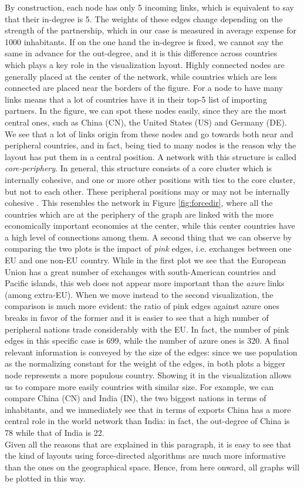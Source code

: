 By construction, each node has only 5 incoming links, which is equivalent to say that their in-degree is 5. The weights of these edges change depending on the strength of the partnership, which in our case is measured in average expense for 1000 inhabitants. If on the one hand the in-degree is fixed, we cannot say the same in advance for the out-degree, and it is this difference across countries which plays a key role in the visualization layout. Highly connected nodes are generally placed at the center of the network, while countries which are less connected are placed near the borders of the figure. For a node to have many links means that a lot of countries have it in their top-5 list of importing partners. In the figure, we can spot these nodes easily, since they are the most central ones, such as China (CN), the United States (US) and Germany (DE). We see that a lot of links origin from these nodes and go towards both near and peripheral countries, and in fact, being tied to many nodes is the reason why the layout has put them in a central position. A network with this structure is called \textit{core-periphery}. In general, this structure consists of a core cluster which is internally cohesive, and one or more other positions with ties to the core cluster, but not to each other. These peripheral positions may or may not be internally cohesive \cite{wasserman1994social}. This resembles the network in Figure \ref{fig:forcedir}, where all the countries which are at the periphery of the graph are linked with the more economically important economies at the center, while this center countries have a high level of connections among them.
A second thing that we can observe by comparing the two plots is the impact of \textit{pink} edges, i.e. exchanges between one EU and one non-EU country. While in the first plot we see that the European Union has a great number of exchanges with south-American countries and Pacific islands, this web does not appear more important than the \textit{azure} links (among extra-EU). When we move instead to the second visualization, the comparison is much more evident: the ratio of pink edges against azure ones breaks in favor of the former and it is easier to see that a high number of peripheral nations trade considerably with the EU. In fact, the number of pink edges in this specific case is 699, while the number of azure ones is 320. 
A final relevant information is conveyed by the size of the edges: since we use population as the normalizing constant for the weight of the edges, in both plots a bigger node represents a more populous country. Showing it in the visualization allows us to compare more easily countries with similar size. For example, we can compare China (CN) and India (IN), the two biggest nations in terms of inhabitants, and we immediately see that in terms of exports China has a more central role in the world network than India: in fact, the out-degree of China is 78 while that of India is 22.\\
Given all the reasons that are explained in this paragraph, it is easy to see that the kind of layouts using force-directed algorithms are much more informative than the ones on the geographical space. Hence, from here onward, all graphs will be plotted in this way.


